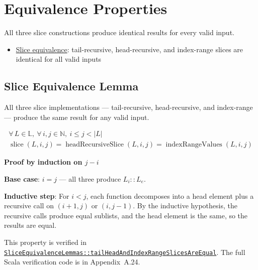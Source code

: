 \section{Equivalence Properties}
\label{sec:equivalence}

All three slice constructions produce identical results for every valid
input.

\begin{itemize}
  \item \href{https://github.com/thiagomata/prime-numbers/blob/list-article-v1.0.0/src/main/scala/v1/chapter3/list/properties/SliceEquivalenceLemmas.scala}{Slice equivalence}:
    tail-recursive, head-recursive, and index-range slices are identical
    for all valid inputs
\end{itemize}

\subsection{Slice Equivalence Lemma}

All three slice implementations --- tail-recursive, head-recursive, and
index-range --- produce the same result for any valid input.

\begin{gather*}
\forall\, L \in \mathbb{L},\ \forall\, i, j \in \mathbb{N},\ i \leq j < |L| \\
\operatorname{slice}(L, i, j) = \operatorname{headRecursiveSlice}(L, i, j) = \operatorname{indexRangeValues}(L, i, j)
\end{gather*}

\textbf{Proof by induction on $j - i$}\par\nopagebreak

\textbf{Base case}: $i = j$ --- all three produce $L_i :: L_e$.\par\nopagebreak

\textbf{Inductive step}: For $i < j$, each function decomposes into a
head element plus a recursive call on $(i+1, j)$ or $(i, j-1)$. By the
inductive hypothesis, the recursive calls produce equal sublists, and the
head element is the same, so the results are equal.

{\raggedright
This property is verified in
\href{https://github.com/thiagomata/prime-numbers/blob/list-article-v1.0.0/src/main/scala/v1/chapter3/list/properties/SliceEquivalenceLemmas.scala}{\texttt{SliceEquivalenceLemmas::\allowbreak tailHeadAndIndexRangeSlicesAreEqual}}.
The full Scala verification code is in Appendix~A.24.
\par}
